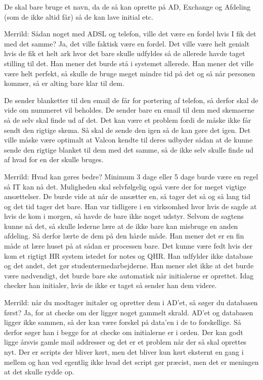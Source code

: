 De skal bare bruge et navn, da de så kan oprette på AD, Exchange og Afdeling (som de ikke altid får) så de kan lave initial etc.

Merrild: Sådan noget med ADSL og telefon, ville det være en fordel hvis I fik det med det samme?
Ja, det ville faktisk være en fordel. Det ville være helt genialt hvis de fik et helt ark hvor det bare skulle udfyldes så de allerede havde taget stilling til det. Han mener det burde stå i systemet allerede. Han mener det ville være helt perfekt, så skulle de bruge meget mindre tid på det og så når personen kommer, så er alting bare klar til dem. 

De sender blanketter til den email de får for portering af telefon, så derfor skal de vide om nummeret vil beholdes. De sender bare en email til dem med skemaerne så de selv skal finde ud af det. Det kan være et problem fordi de måske ikke får sendt den rigtige skema. Så skal de sende den igen så de kan gøre det igen. Det ville måske være optimalt at Valcon kendte til deres udbyder sådan at de kunne sende den rigtige blanket til dem med det samme, så de ikke selv skulle finde ud af hvad for en der skulle bruges.

Merrild: Hvad kan gøres bedre?
Minimum 3 dage eller 5 dage burde være en regel så IT kan nå det. Muligheden skal selvfølgelig også være der for meget vigtige ansættelser. De burde vide at når de ansætter en, så tager det så og så lang tid og det tid tager det bare. Han var tidligere i en virksomhed hvor hvis de sagde at hvis de kom i morgen, så havde de bare ikke noget udstyr. Selvom de sagtens kunne nå det, så skulle lederne lære at de ikke bare kan misbruge en anden afdeling. Så derfor lærte de dem på den hårde måde. Han mener det er en fin måde at lære huset på at sådan er processen bare. Det kunne være fedt hvis der kom et rigtigt HR system istedet for notes og QHR. Han udfylder ikke database og det andet, det gør studentermedarbejderne. Han mener slet ikke at det burde være nødvendigt, det burde bare ske automatisk når initialerne er oprettet. 
Idag checker han initialer, hvis de ikke er taget så sender han dem videre. 

Merrild: når du modtager initaler og opretter dem i AD’et, så søger du databasen først?
Ja, for at checke om der ligger noget gammelt skrald. AD’et og databasen ligger ikke sammen, så der kan være forskel på data’en i de to forskellige. Så derfor søger han i begge for at checke om initialerne er i orden. Der kan godt ligge årsvis gamle mail addresser og det er et problem når der så skal oprettes nyt. Der er scripts der bliver kørt, men det bliver kun kørt eksternt en gang i mellem og han ved egentlig ikke hvad det script gør præcist, men det er meningen at det skulle rydde op.

